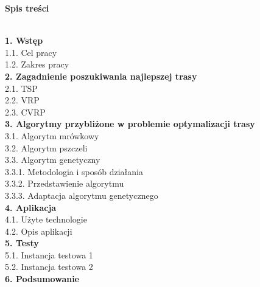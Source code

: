 \documentclass[a4paper, twoside, 12pt, justified]{article}
\begin{document}
	\begin{flushleft}
		\begin{large}\textbf{Spis treści}\end{large}
		\vspace{5mm}\\
		\textbf{1. Wstęp }\\
			\hspace{5mm}1.1. Cel pracy\\
			\hspace{5mm}1.2. Zakres pracy\\
		\textbf{2. Zagadnienie poszukiwania najlepszej trasy }\\
			\hspace{5mm}2.1. TSP\\
			\hspace{5mm}2.2. VRP\\
			\hspace{5mm}2.3. CVRP\\
		\textbf{3. Algorytmy przybliżone w problemie
			optymalizacji trasy }\\
			\hspace{5mm}3.1. Algorytm mrówkowy\\
			\hspace{5mm}3.2. Algorytm pszczeli\\
			\hspace{5mm}3.3. Algorytm genetyczny\\
			\hspace{10mm}3.3.1. Metodologia i sposób działania\\
			\hspace{10mm}3.3.2. Przedstawienie algorytmu\\
			\hspace{10mm}3.3.3. Adaptacja algorytmu genetycznego\\
		\textbf{4. Aplikacja}\\
			\hspace{5mm}4.1. Użyte technologie\\
			\hspace{5mm}4.2. Opis aplikacji\\
		\textbf{5. Testy}\\
			\hspace{5mm}5.1. Instancja testowa 1\\
			\hspace{5mm}5.2. Instancja testowa 2\\
		\textbf{6. Podsumowanie}\\
		
	\end{flushleft}
	\newpage
	
\end{document}

